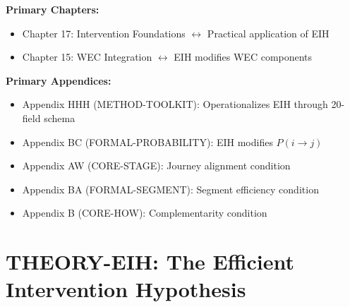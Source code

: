 \begin{tcolorbox}[colback=purple!5!white, colframe=purple!75!black,
    title=Chapter Linkage]

\textbf{Primary Chapters:}
\begin{itemize}[nosep]
\item Chapter 17: Intervention Foundations $\leftrightarrow$ Practical application of EIH
\item Chapter 15: WEC Integration $\leftrightarrow$ EIH modifies WEC components
\end{itemize}

\textbf{Primary Appendices:}
\begin{itemize}[nosep]
\item Appendix HHH (METHOD-TOOLKIT): Operationalizes EIH through 20-field schema
\item Appendix BC (FORMAL-PROBABILITY): EIH modifies $P(i \to j)$
\item Appendix AW (CORE-STAGE): Journey alignment condition
\item Appendix BA (FORMAL-SEGMENT): Segment efficiency condition
\item Appendix B (CORE-HOW): Complementarity condition
\end{itemize}

\end{tcolorbox}


\chapter{THEORY-EIH: The Efficient Intervention Hypothesis}
\label{app:theory-eih}


\begin{abstract}
Why do most behavioral interventions underperform expectations? This appendix
proposes a formal answer: the \textbf{Efficient Intervention Hypothesis (EIH)}.
We prove that intervention effectiveness is bounded by three alignment conditions:
journey phase alignment ($\mu$), segment fit ($\sigma$), and portfolio complementarity
($\gamma$). An intervention achieves its theoretical maximum only when all three
conditions are satisfied simultaneously. Violations explain the systematic 60-70\%
underperformance observed in applied behavioral science. The EIH provides testable
predictions and a normative framework for intervention design.
\end{abstract}

